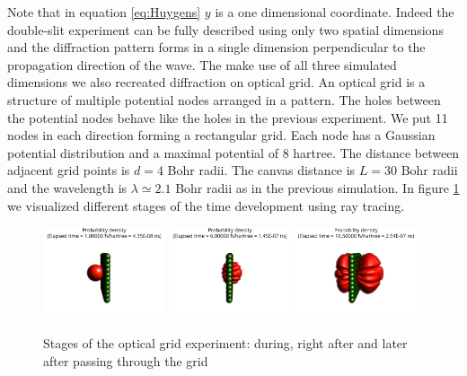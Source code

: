 Note that in equation \ref{eq:Huygens} $y$ is a one dimensional coordinate. Indeed the double-slit experiment can be fully described using only two spatial dimensions and the diffraction pattern forms in a single dimension perpendicular to the propagation direction of the wave.
The make use of all three simulated dimensions we also recreated diffraction on optical grid.
An optical grid is a structure of multiple potential nodes arranged in a pattern.
The holes between the potential nodes behave like the holes in the previous experiment.
We put 11 nodes in each direction forming a rectangular grid.
Each node has a Gaussian potential distribution and a maximal potential of $8$ hartree.
The distance between adjacent grid points is $d = 4$ Bohr radii.
The canvas distance is $L=30$ Bohr radii and the wavelength is $\lambda\simeq 2.1$ Bohr radii as in the previous simulation.
In figure \ref{fig:optical_grid_stages} we visualized different stages of the time development using ray tracing.
\begin{figure}
	\begin{center}
		\includegraphics[width=0.32\textwidth]{figures/optical_grid_01.png}
		\includegraphics[width=0.32\textwidth]{figures/optical_grid_02.png}
		\includegraphics[width=0.32\textwidth]{figures/optical_grid_03.png}
		\caption{Stages of the optical grid experiment: during, right after and later after passing through the grid}
		\label{fig:optical_grid_stages}
	\end{center}	
\end{figure}
